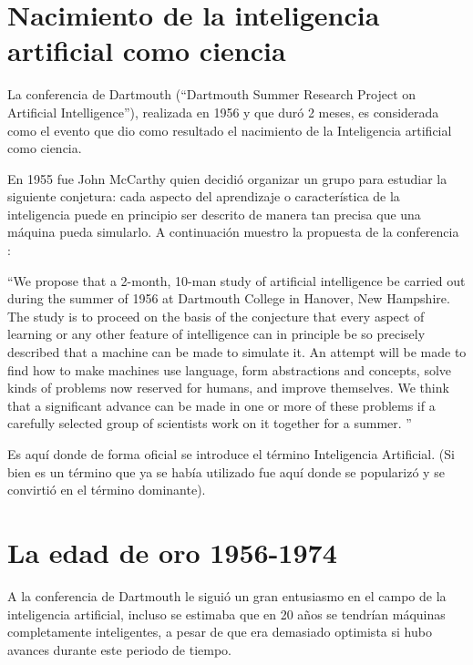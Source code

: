 \documentclass[11pt,fleqn]{book} %
\begin{document}
\section{Nacimiento de la inteligencia artificial como ciencia}

La conferencia de Dartmouth (“Dartmouth Summer Research Project on Artificial Intelligence”), realizada en 1956 y que duró 2 meses, es considerada como el evento que dio como resultado el nacimiento de la Inteligencia artificial como ciencia. 

En 1955 fue John McCarthy quien decidió organizar un grupo para estudiar la siguiente conjetura: cada aspecto del aprendizaje o característica de la inteligencia puede en principio ser descrito de manera tan precisa que una máquina pueda simularlo. A continuación muestro la propuesta de la conferencia \cite{DARTHMOUTH}: 

“We propose that a 2-month, 10-man study of artificial intelligence be carried out during the summer of 1956 at Dartmouth College in Hanover, New Hampshire. The study is to proceed on the basis of the conjecture that every aspect of learning or any other feature of intelligence can in principle be so precisely described that a machine can be made to simulate it. An attempt will be made to find how to make machines use language, form abstractions and concepts, solve kinds of problems now reserved for humans, and improve themselves. We think that a significant advance can be made in one or more of these problems if a carefully selected group of scientists work on it together for a summer. ” 

Es aquí donde de forma oficial se introduce el término Inteligencia Artificial. (Si bien es un término que ya se había utilizado fue aquí donde se popularizó y se convirtió en el término dominante).

\section{La edad de oro 1956-1974} 

A la conferencia de Dartmouth le siguió un gran entusiasmo en el campo de la inteligencia artificial, incluso se estimaba que en 20 años se tendrían máquinas completamente inteligentes, a pesar de que era demasiado optimista si hubo avances durante este periodo de tiempo.
\end{document}

